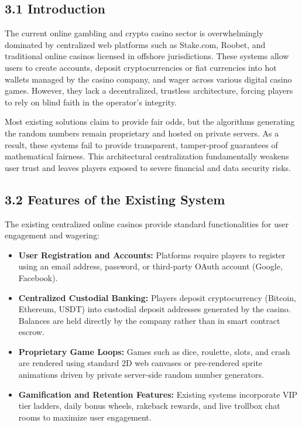 \vspace{1.0cm}
\par
\label{chap:existing}
\vspace{0.15cm}
\par
\vspace{0.3cm}

\subsection*{3.1 Introduction}
The current online gambling and crypto casino sector is overwhelmingly dominated by centralized web platforms such as Stake.com, Roobet, and traditional online casinos licensed in offshore jurisdictions. These systems allow users to create accounts, deposit cryptocurrencies or fiat currencies into hot wallets managed by the casino company, and wager across various digital casino games. However, they lack a decentralized, trustless architecture, forcing players to rely on blind faith in the operator's integrity.

Most existing solutions claim to provide fair odds, but the algorithms generating the random numbers remain proprietary and hosted on private servers. As a result, these systems fail to provide transparent, tamper-proof guarantees of mathematical fairness. This architectural centralization fundamentally weakens user trust and leaves players exposed to severe financial and data security risks.

\subsection*{3.2 Features of the Existing System}
The existing centralized online casinos provide standard functionalities for user engagement and wagering:
\begin{itemize}[leftmargin=1.5em]
    \item \textbf{User Registration and Accounts:} Platforms require players to register using an email address, password, or third-party OAuth account (Google, Facebook).
    \item \textbf{Centralized Custodial Banking:} Players deposit cryptocurrency (Bitcoin, Ethereum, USDT) into custodial deposit addresses generated by the casino. Balances are held directly by the company rather than in smart contract escrow.
    \item \textbf{Proprietary Game Loops:} Games such as dice, roulette, slots, and crash are rendered using standard 2D web canvases or pre-rendered sprite animations driven by private server-side random number generators.
    \item \textbf{Gamification and Retention Features:} Existing systems incorporate VIP tier ladders, daily bonus wheels, rakeback rewards, and live trollbox chat rooms to maximize user engagement.
\end{itemize}

